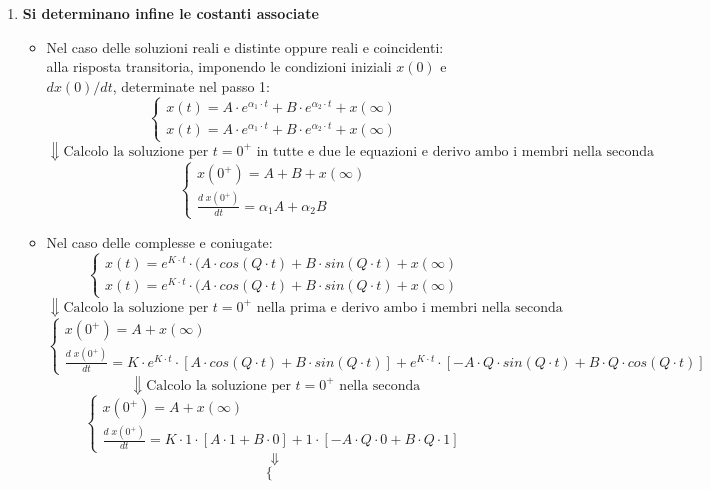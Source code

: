 \documentclass[../main.tex]{subfiles}
\begin{document}
\begin{enumerate}
		\item \textbf{Si determinano infine le costanti associate}
			\begin{itemize}
				\item Nel caso delle soluzioni reali e distinte oppure reali e coincidenti:\\
					alla risposta transitoria, imponendo le condizioni iniziali $x(0)$ e $dx(0)/dt$, determinate nel passo 1:
					$$\begin{cases} 
						x(t) = A \cdot e^{\alpha_1 \cdot t} + B \cdot e^{\alpha_2 \cdot t}+x(\infty) \\
						x(t) = A \cdot e^{\alpha_1 \cdot t} + B \cdot e^{\alpha_2 \cdot t}+x(\infty)
					\end{cases}$$
					$$\Downarrow \text{Calcolo la soluzione per } t=0^+ \text{ in tutte e due le equazioni e derivo ambo i membri nella seconda}$$
					$$\boxed{
						\begin{cases} 
							x(0^+)=A+B+x(\infty) \\
							\frac{d \; x(0^+)}{dt} = \alpha_1 A + \alpha_2 B
					\end{cases}}$$
				\item Nel caso delle complesse e coniugate:
				$$\begin{cases} 
					x(t)=e^{K \cdot t} \cdot (A \cdot cos(Q \cdot t ) + B \cdot sin(Q \cdot t) + x(\infty) \\
					x(t)=e^{K \cdot t} \cdot (A \cdot cos(Q \cdot t ) + B \cdot sin(Q \cdot t) + x(\infty)
				\end{cases}$$
				$$\Downarrow \text{Calcolo la soluzione per } t=0^+ \text{ nella prima e derivo ambo i membri nella seconda}$$
				$$\begin{cases} 
					x(0^+)=A + x(\infty) \\
					\frac{d \; x(0^+)}{dt} = K \cdot e^{K \cdot t} \cdot \left[ A \cdot cos(Q \cdot t) + B \cdot sin(Q \cdot t)\right] + e^{K \cdot t} \cdot \left[-A \cdot Q \cdot sin(Q \cdot t) + B \cdot Q \cdot cos(Q \cdot t)\right]
				\end{cases}$$
				$$\Downarrow \text{Calcolo la soluzione per } t=0^+ \text{ nella seconda}$$
				$$\begin{cases} 
					x(0^+)=A + x(\infty) \\
					\frac{d \; x(0^+)}{dt} = K \cdot 1 \cdot \left[ A \cdot 1 + B \cdot 0 \right] + 1 \cdot \left[-A \cdot Q \cdot 0 + B \cdot Q \cdot 1\right]
				\end{cases}$$
				$$\Downarrow$$
				$$\boxed{
					\begin{cases} 

\end{cases}}$$
\end{itemize}
\end{enumerate}
\end{document}
